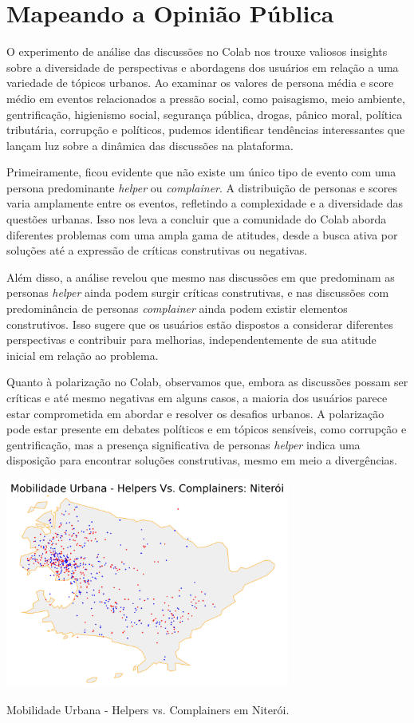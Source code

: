 \section{Mapeando a Opinião Pública}

O experimento de análise das discussões no Colab nos trouxe valiosos insights sobre a diversidade de perspectivas e abordagens dos usuários em relação a uma variedade de tópicos urbanos. Ao examinar os valores de persona média e score médio em eventos relacionados a pressão social, como paisagismo, meio ambiente, gentrificação, higienismo social, segurança pública, drogas, pânico moral, política tributária, corrupção e políticos, pudemos identificar tendências interessantes que lançam luz sobre a dinâmica das discussões na plataforma.

Primeiramente, ficou evidente que não existe um único tipo de evento com uma persona predominante \textit{helper} ou \textit{complainer}. A distribuição de personas e scores varia amplamente entre os eventos, refletindo a complexidade e a diversidade das questões urbanas. Isso nos leva a concluir que a comunidade do Colab aborda diferentes problemas com uma ampla gama de atitudes, desde a busca ativa por soluções até a expressão de críticas construtivas ou negativas.

Além disso, a análise revelou que mesmo nas discussões em que predominam as personas \textit{helper} ainda podem surgir críticas construtivas, e nas discussões com predominância de personas \textit{complainer} ainda podem existir elementos construtivos. Isso sugere que os usuários estão dispostos a considerar diferentes perspectivas e contribuir para melhorias, independentemente de sua atitude inicial em relação ao problema.

Quanto à polarização no Colab, observamos que, embora as discussões possam ser críticas e até mesmo negativas em alguns casos, a maioria dos usuários parece estar comprometida em abordar e resolver os desafios urbanos. A polarização pode estar presente em debates políticos e em tópicos sensíveis, como corrupção e gentrificação, mas a presença significativa de personas \textit{helper} indica uma disposição para encontrar soluções construtivas, mesmo em meio a divergências.

\begin{quadro}[htb]
	\centering
	\includegraphics[width=0.7\textwidth]{images/network_niteroi_personas_plot.png}
	\caption{Mobilidade Urbana - Helpers vs. Complainers em Niterói.}
	\label{fig:network_niteroi_personas_plot}
\end{quadro}

